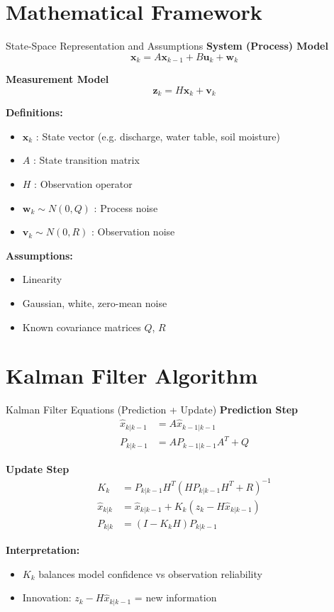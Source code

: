 \documentclass[8pt]{beamer}
\begin{document}
\section{Mathematical Framework}

\begin{frame}{State-Space Representation and Assumptions}
\textbf{System (Process) Model}
\begin{equation}
\mathbf{x}_k = A\mathbf{x}_{k-1} + B\mathbf{u}_k + \mathbf{w}_k
\end{equation}

\textbf{Measurement Model}
\begin{equation}
\mathbf{z}_k = H\mathbf{x}_k + \mathbf{v}_k
\end{equation}

\textbf{Definitions:}
\begin{itemize}
\item $\mathbf{x}_k$ : State vector (e.g. discharge, water table, soil moisture)
\item $A$ : State transition matrix
\item $H$ : Observation operator
\item $\mathbf{w}_k \sim N(0,Q)$ : Process noise
\item $\mathbf{v}_k \sim N(0,R)$ : Observation noise
\end{itemize}

\textbf{Assumptions:}
\begin{itemize}
\item Linearity
\item Gaussian, white, zero-mean noise
\item Known covariance matrices $Q$, $R$
\end{itemize}
\end{frame}

\section{Kalman Filter Algorithm}

\begin{frame}{Kalman Filter Equations (Prediction + Update)}
\textbf{Prediction Step}
\begin{align}
\hat{x}_{k|k-1} &= A\hat{x}_{k-1|k-1} \\
P_{k|k-1} &= A P_{k-1|k-1} A^T + Q
\end{align}

\textbf{Update Step}
\begin{align}
K_k &= P_{k|k-1} H^T (H P_{k|k-1} H^T + R)^{-1} \\
\hat{x}_{k|k} &= \hat{x}_{k|k-1} + K_k(z_k - H\hat{x}_{k|k-1}) \\
P_{k|k} &= (I - K_k H) P_{k|k-1}
\end{align}

\textbf{Interpretation:}
\begin{itemize}
\item $K_k$ balances model confidence vs observation reliability
\item Innovation: $z_k - H\hat{x}_{k|k-1}$ = new information
\end{itemize}
\end{frame}
\end{document}
